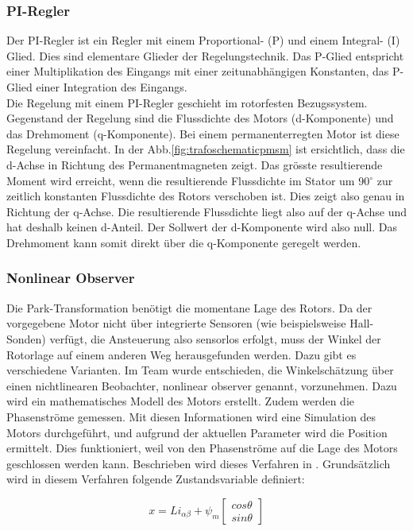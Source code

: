 \subsubsection{PI-Regler}
Der PI-Regler ist ein Regler mit einem Proportional- (P) und einem Integral- (I) Glied. Dies sind elementare Glieder der Regelungstechnik. Das P-Glied entspricht einer Multiplikation des Eingangs mit einer zeitunabhängigen Konstanten, das P-Glied einer Integration des Eingangs. 
\\
Die Regelung mit einem PI-Regler geschieht im rotorfesten Bezugssystem. Gegenstand der Regelung sind die Flussdichte des Motors (d-Komponente) und das Drehmoment (q-Komponente). Bei einem permanenterregten Motor ist diese Regelung vereinfacht. In der Abb.\ref{fig:trafoschematicpmsm} ist ersichtlich, dass die d-Achse in Richtung des Permanentmagneten zeigt. Das grösste resultierende Moment wird erreicht, wenn die resultierende Flussdichte im Stator um 90\(^\circ\) zur zeitlich konstanten Flussdichte des Rotors verschoben ist. Dies zeigt also genau in Richtung der q-Achse. Die resultierende Flussdichte liegt also auf der q-Achse und hat deshalb keinen d-Anteil. Der Sollwert der d-Komponente wird also null. Das Drehmoment kann somit direkt über die q-Komponente geregelt werden.

\subsubsection{Nonlinear Observer}
Die Park-Transformation benötigt die momentane Lage des Rotors. Da der vorgegebene Motor nicht über integrierte Sensoren (wie beispielsweise Hall-Sonden) verfügt, die Ansteuerung also sensorlos erfolgt, muss der Winkel der Rotorlage auf einem anderen Weg herausgefunden werden. Dazu gibt es verschiedene Varianten. 
Im Team wurde entschieden, die Winkelschätzung über einen nichtlinearen Beobachter, nonlinear observer genannt, vorzunehmen. Dazu wird ein mathematisches Modell des Motors erstellt. Zudem werden die Phasenströme gemessen. Mit diesen Informationen wird eine Simulation des Motors durchgeführt, und aufgrund der aktuellen Parameter wird die Position ermittelt. Dies funktioniert, weil von den Phasenströme auf die Lage des Motors geschlossen werden kann. Beschrieben wird dieses Verfahren in \cite{IEEE_nonlinearObserver}. Grundsätzlich wird in diesem Verfahren folgende Zustandsvariable definiert:

\begin{equation}\label{statevar}
	x = Li_{\alpha\beta}+\psi_m \left[ \begin{array}{c} cos\theta \\ sin\theta \end{array} \right]
\end{equation}

